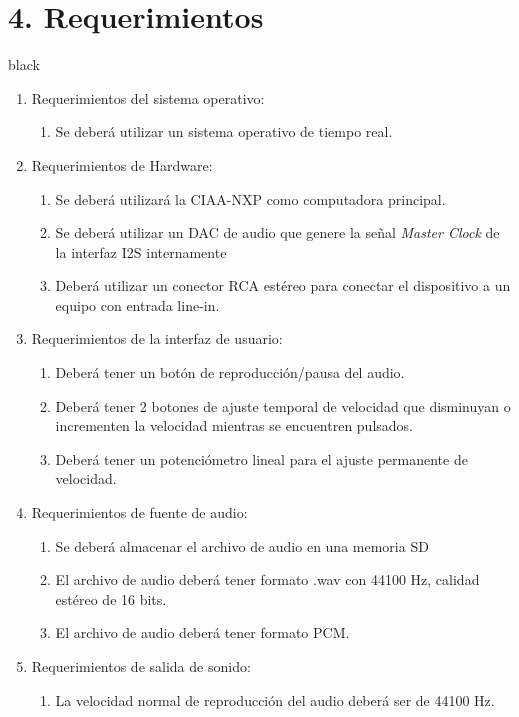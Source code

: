 \documentclass[11pt]{charter}
\begin{document}
\section{4. Requerimientos}
\label{sec:requerimientos}
\begin{consigna}{black}
\begin{enumerate}
\item Requerimientos del sistema operativo:
	\begin{enumerate}
	\item Se deberá utilizar un sistema operativo de tiempo real.
	\end{enumerate}
\item Requerimientos de Hardware:
	\begin{enumerate}
	\item Se deberá utilizará la CIAA-NXP como computadora principal.
	\item Se deberá utilizar un DAC de audio que genere la señal \textit{Master Clock} de la interfaz I2S internamente 
	\item Deberá utilizar un conector RCA estéreo para conectar el dispositivo a un equipo con entrada  line-in.
	\end{enumerate}
\item Requerimientos de la interfaz de usuario:
	\begin{enumerate}
	\item Deberá tener un botón de reproducción/pausa del audio.
	\item Deberá tener 2 botones de ajuste temporal de velocidad que disminuyan o incrementen la velocidad mientras se encuentren pulsados.
	\item Deberá tener un potenciómetro lineal para el ajuste permanente de velocidad.	
	\end{enumerate}
\item Requerimientos de fuente de audio:
	\begin{enumerate}
	\item Se deberá almacenar el archivo de audio en una memoria SD
	\item El archivo de audio deberá tener formato .wav con 44100 Hz, calidad estéreo de 16 bits.
	\item El archivo de audio deberá tener formato PCM.
	\end{enumerate}
\item Requerimientos de salida de sonido:
	\begin{enumerate}
	\item La velocidad normal de reproducción del audio deberá ser de 44100 Hz.

\end{enumerate}
\end{enumerate}
\end{consigna}
\end{document}
